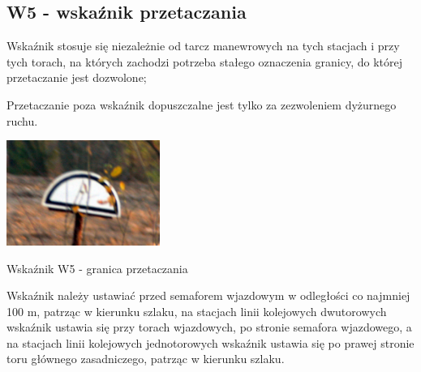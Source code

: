 \subsection{W5 - wskaźnik przetaczania}
\begin{tcolorbox}[colback=black!5!white,colframe=white!55!black,title=Wskaźnik W5]
Wskaźnik stosuje się niezależnie od tarcz manewrowych na tych stacjach i przy tych torach, na których zachodzi potrzeba stałego oznaczenia granicy, do której przetaczanie jest dozwolone;
\end{tcolorbox} Przetaczanie poza wskaźnik dopuszczalne jest tylko za zezwoleniem dyżurnego ruchu. 
	\begin{marginfigure}
	\includegraphics[width=5cm]{skryptkierownik-img/skryptkierownik-img009.jpg}
	\caption{Wskaźnik W5 - granica przetaczania}
\end{marginfigure}
Wskaźnik należy ustawiać przed semaforem wjazdowym w odległości co najmniej 100 m, patrząc w kierunku szlaku, na stacjach linii kolejowych dwutorowych wskaźnik ustawia się przy torach wjazdowych, po stronie semafora wjazdowego, a na stacjach linii kolejowych jednotorowych wskaźnik ustawia się po prawej stronie toru głównego zasadniczego, patrząc w kierunku szlaku.



